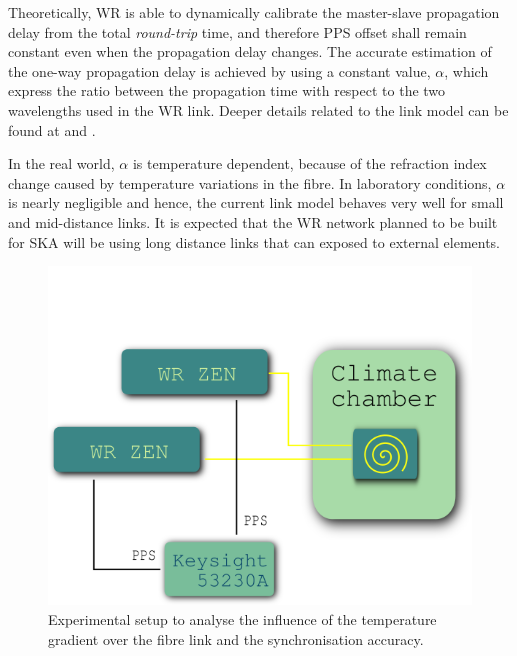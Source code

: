 Theoretically, WR is able to dynamically calibrate the master-slave 
propagation delay from the total \textit{round-trip} time, and therefore PPS 
offset shall remain constant even when the propagation delay changes. The 
accurate estimation of the one-way propagation delay is achieved by using 
a constant value, $\alpha$, which express the ratio between the propagation time 
with respect to the two wavelengths used in the WR link. Deeper details related to the 
link model can be found at \cite{Wlostowski2011} and \cite{Daniluk2012}.

In the real world, $\alpha$ is temperature dependent, because of the 
refraction index change caused by temperature variations in the fibre.
In laboratory conditions, $\alpha$ is nearly negligible and hence,
the current link model behaves very well for small and mid-distance links. 
It is expected that the WR network planned to be built for SKA will be using long distance
links that can exposed to external elements. 


\begin{figure}
	\centering
	\includegraphics[width=0.7\linewidth]{img/tempsetup}
	\caption[Configuration of the climate chamber experiments]{Experimental 
		setup to analyse the influence of the temperature gradient over the 
		fibre link and the synchronisation accuracy.}
	\label{fig:tempsetup}
\end{figure}

